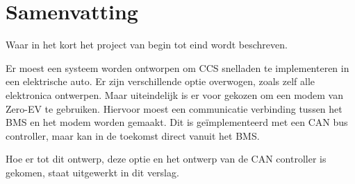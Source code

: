 \chapter{Samenvatting}
\label{Samenvatting}

\begin{center}
    \begin{minipage}{0.5\textwidth}
        \begin{small}
            Waar in het kort het project van begin tot eind wordt beschreven.
        \end{small}
    \end{minipage}
    \vspace{0.5cm}
\end{center}

Er moest een systeem worden ontworpen om CCS snelladen te implementeren in een
elektrische auto. Er zijn verschillende optie overwogen, zoals zelf alle
elektronica ontwerpen. Maar uiteindelijk is er voor gekozen om een modem van
Zero-EV te gebruiken. Hiervoor moest een communicatie verbinding tussen het BMS
en het modem worden gemaakt. Dit is geïmplementeerd met een CAN bus
controller, maar kan in de toekomst direct vanuit het BMS.

Hoe er tot dit ontwerp, deze optie en het ontwerp van de CAN controller is
gekomen, staat uitgewerkt in dit verslag.






